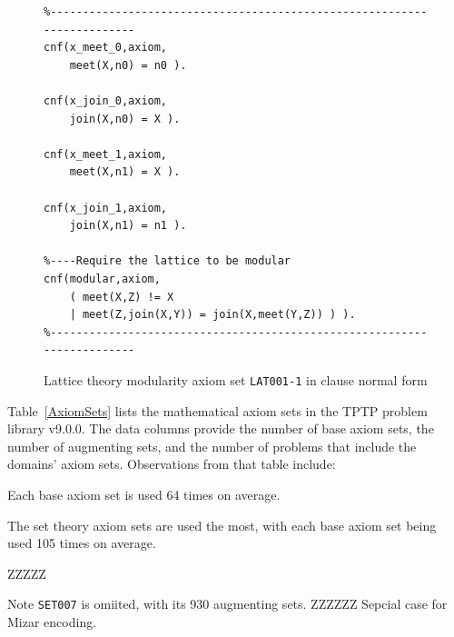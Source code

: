 \documentclass[runningheads]{llncs}
\newenvironment{packed_itemize}{
\vspace*{-0.2em}
\begin{itemize}
\setlength{\partopsep}{0pt}
\setlength{\itemsep}{1pt}
\setlength{\parskip}{0pt}
\setlength{\parsep}{0pt}
}{\end{itemize}}
\begin{document}
\begin{figure}[tb]
\centering
{\footnotesize
{\setlength{\baselineskip}{3mm}
\begin{verbatim}
%------------------------------------------------------------------------
cnf(x_meet_0,axiom,
    meet(X,n0) = n0 ).

cnf(x_join_0,axiom,
    join(X,n0) = X ).

cnf(x_meet_1,axiom,
    meet(X,n1) = X ).

cnf(x_join_1,axiom,
    join(X,n1) = n1 ).

%----Require the lattice to be modular
cnf(modular,axiom,
    ( meet(X,Z) != X
    | meet(Z,join(X,Y)) = join(X,meet(Y,Z)) ) ).
%------------------------------------------------------------------------
\end{verbatim}
}}
\caption{Lattice theory modularity axiom set {\tt LAT001-1} in clause normal form}
\label{ExampleAxioms1}
\end{figure}

Table~\ref{AxiomSets} lists the mathematical axiom sets in the TPTP problem library v9.0.0.
The data columns provide the number of base axiom sets, the number of augmenting sets, and
the number of problems that include the domains' axiom sets.
Observations from that table include:
\begin{packed_itemize}
\item Each base axiom set is used 64 times on average.
\item The set theory axiom sets are used the most, with each base axiom set being used 105
      times on average.
\item ZZZZZ
\end{packed_itemize}

Note {\tt SET007} is omiited, with its 930 augmenting sets. ZZZZZZ
Sepcial case for Mizar encoding.
\end{document}
